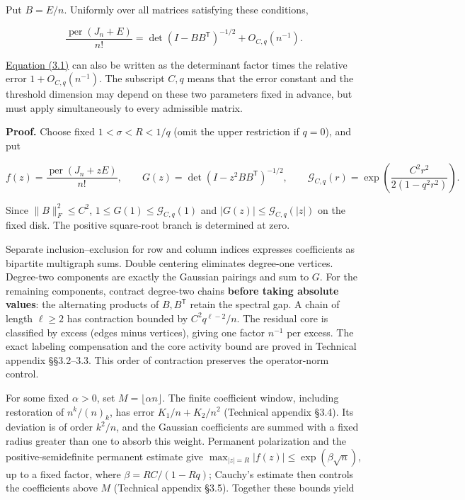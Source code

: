 \documentclass[11pt,a4paper]{article}
\begin{document}
Put \(B=E/n\). Uniformly over all matrices satisfying these conditions,

\begin{equation}
\frac{\operatorname{per}(J_n+E)}{n!}
=\det(I-BB^{\mathsf T})^{-1/2}+O_{C,q}(n^{-1}).
\tag{3.1}
\label{eq-uniform-permanent}
\end{equation}

\hyperref[eq-uniform-permanent]{Equation (3.1)} can also be written as the determinant factor times the relative error \(1+O_{C,q}(n^{-1})\). The subscript \(C,q\) means that the error constant and the threshold dimension may depend on these two parameters fixed in advance, but must apply simultaneously to every admissible matrix.

\textbf{Proof.} Choose fixed \(1<\sigma<R<1/q\) (omit the upper restriction if \(q=0\)), and put

\[
f(z)=\frac{\operatorname{per}(J_n+zE)}{n!},\qquad
G(z)=\det(I-z^2BB^{\mathsf T})^{-1/2},\qquad
\mathcal G_{C,q}(r)=\exp\!\left(\frac{C^2r^2}{2(1-q^2r^2)}\right).
\]

Since \(\|B\|_F^2\le C^2\), \(1\le G(1)\le\mathcal G_{C,q}(1)\) and \(|G(z)|\le\mathcal G_{C,q}(|z|)\) on the fixed disk. The positive square-root branch is determined at zero.

Separate inclusion--exclusion for row and column indices expresses coefficients as bipartite multigraph sums. Double centering eliminates degree-one vertices. Degree-two components are exactly the Gaussian pairings and sum to \(G\). For the remaining components, contract degree-two chains \textbf{before taking absolute values}: the alternating products of \(B,B^{\mathsf T}\) retain the spectral gap. A chain of length \(\ell\ge2\) has contraction bounded by \(C^2q^{\ell-2}/n\). The residual core is classified by excess (edges minus vertices), giving one factor \(n^{-1}\) per excess. The exact labeling compensation and the core activity bound are proved in Technical appendix §§3.2--3.3. This order of contraction preserves the operator-norm control.

For some fixed \(\alpha>0\), set \(M=\lfloor\alpha n\rfloor\). The finite coefficient window, including restoration of \(n^k/(n)_k\), has error \(K_1/n+K_2/n^2\) (Technical appendix §3.4). Its deviation is of order \(k^2/n\), and the Gaussian coefficients are summed with a fixed radius greater than one to absorb this weight. Permanent polarization and the positive-semidefinite permanent estimate give \(\max_{|z|=R}|f(z)|\le\exp(\beta\sqrt n)\), up to a fixed factor, where \(\beta=RC/(1-Rq)\); Cauchy's estimate then controls the coefficients above \(M\) (Technical appendix §3.5). Together these bounds yield
\end{document}
